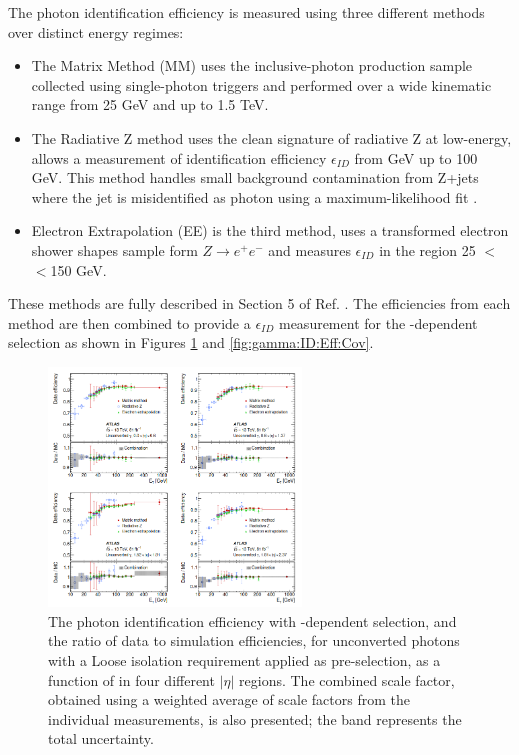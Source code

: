 The photon identification efficiency is measured using three different methods over distinct energy regimes:
\begin{itemize}
\item The Matrix Method (MM) uses the inclusive-photon production sample collected using single-photon triggers and performed over a wide kinematic range from 25 GeV and up to 1.5 TeV. 
\item The Radiative Z method uses the clean signature of radiative Z at low-energy, allows a measurement of identification efficiency $\epsilon_{ID}$ from  GeV up to 100 GeV. This method handles small background contamination from Z+jets where the jet is misidentified as photon using a maximum-likelihood fit \cite{Photon_Eff_Run1}. 
\item Electron Extrapolation (EE) is the third method, uses a transformed electron shower shapes sample form $Z\rightarrow e^+e^-$ and measures $\epsilon_{ID}$ in the region 25 $<$\eT$<$150 GeV.
\end{itemize}
These methods are fully described in Section 5 of Ref. \cite{Photon_Eff_2015}. The efficiencies from each method are then combined to provide a $\epsilon_{ID}$ measurement for the \eT-dependent selection as shown in Figures \ref{fig:gamma:ID:Eff:UnCov} and \ref{fig:gamma:ID:Eff:Cov}. 
\begin{figure}[htbp]
    \centering
    \includegraphics[width=0.6\textwidth]{Ch3/Img/Unconverted_Eff_2017.png}
    \caption{The photon identification efficiency with \eT-dependent selection, and the ratio of data to simulation efficiencies, for unconverted photons with a Loose isolation requirement applied as pre-selection, as a function of \eT in four different $|\eta|$ regions. The combined scale factor, obtained using a weighted average of scale factors from the individual measurements, is also presented; the band represents the total uncertainty.}
    \label{fig:gamma:ID:Eff:UnCov}
\end{figure}
